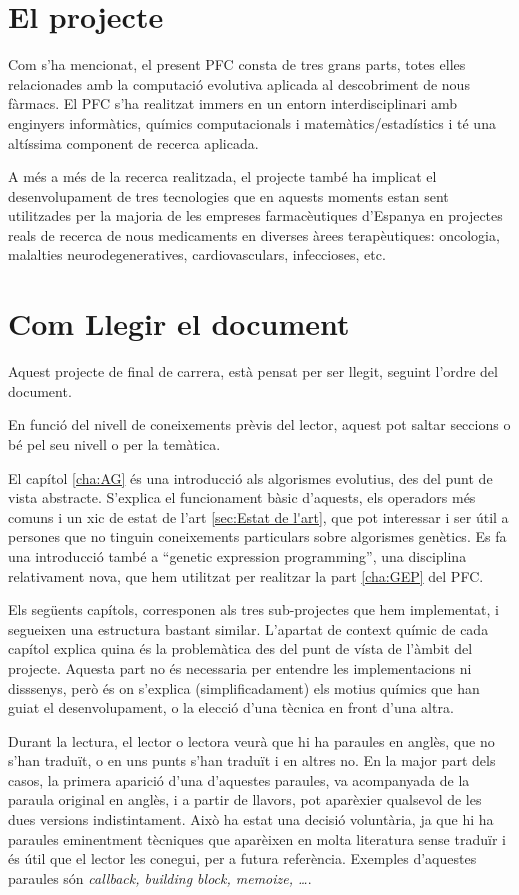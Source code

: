 \section{El projecte}

Com s'ha mencionat, el present PFC consta de tres grans
parts, totes elles relacionades amb la computació evolutiva aplicada al
descobriment de nous fàrmacs. El PFC s'ha realitzat immers en un entorn
interdisciplinari amb enginyers informàtics, químics computacionals i
matemàtics/estadístics i té una altíssima component de recerca aplicada. 

A més a més de la recerca realitzada, el projecte també ha implicat el
desenvolupament de tres tecnologies que en aquests moments estan sent
utilitzades per la majoria de les empreses farmacèutiques d'Espanya en projectes
reals de recerca de nous medicaments en diverses àrees terapèutiques: oncologia,
malalties neurodegeneratives, cardiovasculars, infeccioses, etc.

\section{Com Llegir el document} %
\label{sec:Com Llegir el document}

Aquest projecte de final de carrera, està pensat per ser llegit, seguint l'ordre
del document.

En funció del nivell de coneixements prèvis del lector, aquest pot saltar
seccions o bé pel seu nivell o per la temàtica.

El capítol \ref{cha:AG} és una introducció als algorismes evolutius, des del
punt de vista abstracte.  S'explica el funcionament bàsic d'aquests, els
operadors més comuns i un xic de estat de l'art \ref{sec:Estat de l'art}, que
pot interessar i ser útil a persones que no tinguin coneixements particulars
sobre algorismes genètics.  Es fa una introducció també a ``genetic expression
programming'', una disciplina relativament nova, que hem utilitzat per realitzar
la part \ref{cha:GEP} del PFC.

Els següents capítols, corresponen als tres sub-projectes que hem implementat, i
segueixen una estructura bastant similar.  L'apartat de context químic de cada
capítol explica quina és la problemàtica des del punt de vísta de l'àmbit del
projecte.  Aquesta part no és necessaria per entendre les implementacions ni
disssenys, però és on s'explica (simplificadament) els motius químics que han
guiat el desenvolupament, o la elecció d'una tècnica en front d'una altra.

Durant la lectura, el lector o lectora veurà que hi ha paraules en anglès, que
no s'han traduït, o en uns punts s'han traduït i en altres no.  En la major part
dels casos, la primera aparició d'una d'aquestes paraules, va acompanyada de la
paraula original en anglès, i a partir de llavors, pot aparèxier qualsevol de
les dues versions indistintament.  Això ha estat una decisió voluntària, ja que
hi ha paraules eminentment tècniques que aparèixen en molta literatura sense
traduïr i és útil que el lector les conegui, per a futura referència.  Exemples
d'aquestes paraules són \emph{callback, building block, memoize, \ldots}.

